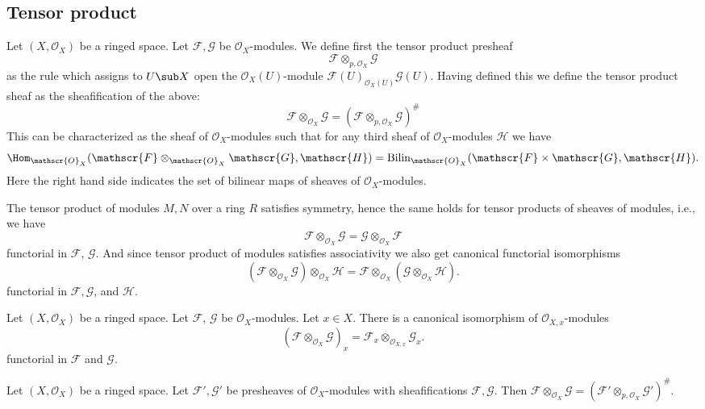 \subsection{Tensor product}
Let $(X,\mathscr{O}_X)$ be a ringed space. Let $\mathscr{F},\mathscr{G}$ be $\mathscr{O}_X$-modules. We define first the tensor product presheaf
\[\mathscr{F}\otimes_{p,\mathscr{O}_X}\mathscr{G}\]
as the rule which assigns to $U\sub X$ open the $\mathscr{O}_X(U)$-module $\mathscr{F}(U)_{\mathscr{O}_X(U)}\mathscr{G}(U)$. Having defined this we define the tensor product sheaf as the sheafification of the above:
\[\mathscr{F}\otimes_{\mathscr{O}_X}\mathscr{G}=(\mathscr{F}\otimes_{p,\mathscr{O}_X}\mathscr{G})^{\#}\]
This can be characterized as the sheaf of $\mathscr{O}_X$-modules such that for any third sheaf of $\mathscr{O}_X$-modules $\mathscr{H}$ we have
\[\Hom_{\mathscr{O}_X}(\mathscr{F}\otimes_{\mathscr{O}_X}\mathscr{G},\mathscr{H})=\mathrm{Bilin}_{\mathscr{O}_X}(\mathscr{F}\times\mathscr{G},\mathscr{H}).\]
Here the right hand side indicates the set of bilinear maps of sheaves of $\mathscr{O}_X$-modules.\par
The tensor product of modules $M,N$ over a ring $R$ satisfies symmetry, hence the same holds for tensor products of sheaves of modules, i.e., we have
\[\mathscr{F}\otimes_{\mathscr{O}_X}\mathscr{G}=\mathscr{G}\otimes_{\mathscr{O}_X}\mathscr{F}\]
functorial in $\mathscr{F}$, $\mathscr{G}$. And since tensor product of modules satisfies associativity we also get canonical functorial isomorphisms
\[(\mathscr{F}\otimes_{\mathscr{O}_X}\mathscr{G})\otimes_{\mathscr{O}_X}\mathscr{H}=\mathscr{F}\otimes_{\mathscr{O}_X}(\mathscr{G}\otimes_{\mathscr{O}_X}\mathscr{H}).\]
functorial in $\mathscr{F},\mathscr{G}$, and $\mathscr{H}$.
\begin{proposition}
Let $(X,\mathscr{O}_X)$ be a ringed space. Let $\mathscr{F}$, $\mathscr{G}$ be $\mathscr{O}_X$-modules. Let $x\in X$. There is a canonical isomorphism of $\mathscr{O}_{X,x}$-modules
\[(\mathscr{F}\otimes_{\mathscr{O}_{X}}\mathscr{G})_x=\mathscr{F}_x\otimes_{\mathscr{O}_{X,x}}\mathscr{G}_x.\]
functorial in $\mathscr{F}$ and $\mathscr{G}$.
\end{proposition}
\begin{proposition}
Let $(X,\mathscr{O}_X)$ be a ringed space. Let $\mathscr{F}',\mathscr{G}'$ be presheaves of $\mathscr{O}_X$-modules with sheafifications $\mathscr{F},\mathscr{G}$. Then $\mathscr{F}\otimes_{\mathscr{O}_{X}}\mathscr{G}=(\mathscr{F}'\otimes_{p,\mathscr{O}_{X}}\mathscr{G}')^{\#}$.
\end{proposition}
